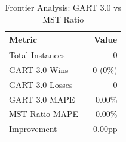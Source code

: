 \begin{table}[ht]
\centering
\caption{Frontier Analysis: GART 3.0 vs MST Ratio}
\label{tab:frontier}
\begin{tabular}{l r}
\toprule
Metric & Value \\
\midrule
Total Instances & 0 \\
GART 3.0 Wins & 0 (0\%) \\
GART 3.0 Losses & 0 \\
GART 3.0 MAPE & 0.00\% \\
MST Ratio MAPE & 0.00\% \\
Improvement & +0.00pp \\
\bottomrule
\end{tabular}
\end{table}